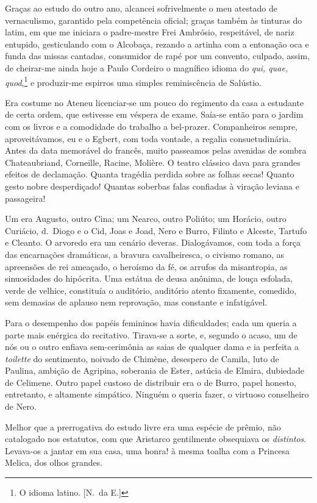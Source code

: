 Graças ao estudo do outro ano, alcancei sofrivelmente o meu
atestado de vernaculismo, garantido pela competência oficial; graças
também às tinturas do latim, em que me iniciara o padre{}-mestre Frei
Ambrósio, respeitável, de nariz entupido, gesticulando com o Alcobaça,
rezando a artinha com a entonação oca e funda das missas cantadas,
consumidor de rapé por um convento, culpado, assim, de cheirar{}-me
ainda hoje a Paulo Cordeiro o magnífico idioma do \textit{qui, quae, quod},\footnote{ O idioma 
latino. [N.~da E.]} e produzir{}-me espirros uma simples reminiscência de Salústio. 

Era costume no Ateneu licenciar{}-se um pouco do regimento da casa a
estudante de certa ordem, que estivesse em véspera de exame. Saía{}-se
então para o jardim com os livros e a comodidade do trabalho a
bel{}-prazer. Companheiros sempre, aproveitávamos, eu e o Egbert, com
toda vontade, a regalia consuetudinária. Antes da data memorável do
francês, muito passeamos pelas avenidas de sombra Chateaubriand,
Corneille, Racine, Molière. O teatro clássico dava para grandes efeitos
de declamação. Quanta tragédia perdida sobre as folhas secas! Quanto
gesto nobre desperdiçado! Quantas soberbas falas confiadas à viração
leviana e passageira! 

Um era Augusto, outro Cina; um Nearco, outro
Poliúto; um Horácio, outro Curiácio, d.~Diogo e o Cid, Joas e Joad,
Nero e Burro, Filinto e Alceste, Tartufo e Cleanto. O arvoredo era um
cenário deveras. Dialogávamos, com toda a força das encarnações
dramáticas, a bravura cavalheiresca, o civismo romano, as apreensões de
rei ameaçado, o heroísmo da fé, os arrufos da misantropia, as
sinuosidades do hipócrita. Uma estátua de deusa anônima, de louça
esfolada, verde de velhice, constituía o auditório, auditório atento
fixamente, comedido, sem demasias de aplauso nem reprovação, mas
constante e infatigável. 

Para o desempenho dos papéis femininos havia
dificuldades; cada um queria a parte mais enérgica do recitativo.
Tirava{}-se a sorte, e, segundo o acaso, um de nós ou o outro enfiava
sem{}-cerimônia as saias de qualquer dama e ia perfeita a \textit{toilette} do
sentimento, noivado de Chimène, desespero de Camila, luto de Paulina,
ambição de Agripina, soberania de Ester, astúcia de Elmira, dubiedade
de Celimene. Outro papel custoso de distribuir era o de Burro, papel
honesto, entretanto, e altamente simpático. Ninguém o queria fazer, o
virtuoso conselheiro de Nero. 

Melhor que a prerrogativa do estudo livre
era uma espécie de prêmio, não catalogado nos estatutos, com que
Aristarco gentilmente obsequiava os \textit{distintos}. Levava{}-os a jantar em
sua casa, uma honra! à mesma toalha com a Princesa Melica, dos olhos grandes. 

